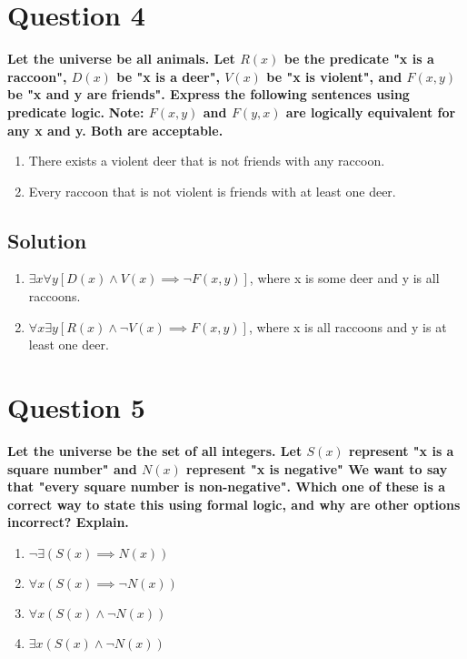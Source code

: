 \documentclass[11pt]{article}
\begin{document}
\clearpage
\section*{Question 4}
    \textbf{Let the universe be all animals. Let \(R(x)\) be the predicate "x is a raccoon", \(D(x)\) be "x is a deer", \(V(x)\) be "x is violent", and \(F(x, y)\) be "x and y are friends". Express the following sentences using predicate logic.}\newline
    \textbf{Note: \(F(x, y)\) and \(F(y, x)\) are logically equivalent for any x and y. Both are acceptable.}
    \begin{enumerate}[label=(\alph*)]
        \item There exists a violent deer that is not friends with any raccoon.
        \item Every raccoon that is not violent is friends with at least one deer.
    \end{enumerate}
    \subsection*{Solution}
    \begin{enumerate}[label=(\alph*)]
        \item \(\exists x \forall y [D(x) \land V(x) \implies \neg F(x,y)]\), where x is some deer and y is all raccoons.
        \item \(\forall x \exists y [R(x) \land \neg V(x) \implies F(x,y)]\), where x is all raccoons and y is at least one deer.
    \end{enumerate}

\clearpage
\section*{Question 5}
    \textbf{Let the universe be the set of all integers. Let \(S(x)\) represent "x is a square number" and \(N(x)\) represent "x is negative" We want to say that "every square number is non-negative". Which one of these is a correct way to state this using formal logic, and why are other options incorrect? Explain.}
    \begin{enumerate}[label=(\alph*)]
        \item \(\neg \exists (S(x) \implies N(x))\)
        \item \(\forall x(S(x) \implies \neg N(x))\)
        \item \(\forall x(S(x) \land \neg N(x))\)
        \item \(\exists x (S(x) \land \neg N(x))\)
    \end{enumerate}
\end{document}
